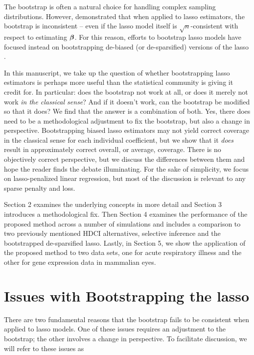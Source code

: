 The bootstrap is often a natural choice for handling complex sampling distributions. However, \cite{Chatterjee2010} demonstrated that when applied to lasso estimators, the bootstrap is inconsistent -- even if the lasso model itself is $\sqrt{n}$-consistent with respect to estimating $\boldsymbol{\beta}$. For this reason, efforts to bootstrap lasso models have focused instead on bootstrapping de-biased (or de-sparsified) versions of the lasso \citep{Dezeure2017}.

In this manuscript, we take up the question of whether bootstrapping lasso estimators is perhaps more useful than the statistical community is giving it credit for. In particular: does the bootstrap not work at all, or does it merely not work \emph{in the classical sense}? And if it doesn't work, can the bootstrap be modified so that it does? We find that the answer is a combination of both. Yes, there does need to be a methodological adjustment to fix the bootstrap, but also a change in perspective. Bootstrapping biased lasso estimators may not yield correct coverage in the classical sense for each individual coefficient, but we show that it \emph{does} result in approximately correct overall, or average, coverage. There is no objectively correct perspective, but we discuss the differences between them and hope the reader finds the debate illuminating. For the sake of simplicity, we focus on lasso-penalized linear regression, but most of the discussion is relevant to any sparse penalty and loss.

Section 2 examines the underlying concepts in more detail and Section 3 introduces a methodological fix. Then Section 4 examines the performance of the proposed method across a number of simulations and includes a comparison to two previously mentioned HDCI alternatives, selective inference and the bootstrapped de-sparsified lasso. Lastly, in Section 5, we show the application of the proposed method to two data sets, one for acute respiratory illness and the other for gene expression data in mammalian eyes.

\section{Issues with Bootstrapping the lasso}
\label{Sec:Difficulties}

There are two fundamental reasons that the bootstrap fails to be consistent when applied to lasso models. One of these issues requires an adjustment to the bootstrap; the other involves a change in perspective. To facilitate discussion, we will refer to these issues as

